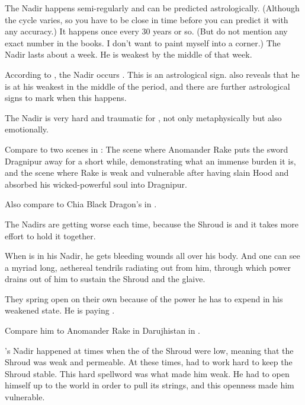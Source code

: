 The Nadir happens semi-regularly and can be predicted astrologically. 
(Although the cycle varies, so you have to be close in time before you can predict it with any accuracy.)
It happens once every 30 years or so. 
(But do not mention any exact number in the books. I don't want to paint myself into a corner.)
The Nadir lasts about a week. 
He is weakest by the middle of that week. 

According to \WanderersInDarknessEmph, the Nadir occurs . 
This is an astrological sign. 
\WanderersInDarknessEmph also reveals that he is at his weakest in the middle of the period, and there are further astrological signs to mark when this happens. 

The Nadir is very hard and traumatic for \Ishnaruchaefir, not only metaphysically but also emotionally. 

Compare to two scenes in \cite{StevenErikson:TolltheHounds}:
The scene where Anomander Rake puts the sword Dragnipur away for a short while, demonstrating what an immense burden it is, and the scene where Rake is weak and vulnerable after having slain Hood and absorbed his wicked-powerful soul into Dragnipur. 

Also compare to Chia Black Dragon's  in \cite{StephenMarley:SpiritMirror}. 

The Nadirs are getting worse each time, because the Shroud is  and it takes more effort to hold it together. 

When \Ishnaruchaefir is in his Nadir, he gets bleeding wounds all over his body. 
And one can see a myriad long, aethereal tendrils radiating out from him, through which power drains out of him to sustain the Shroud and the glaive. 

They spring open on their own because of the power he has to expend in his weakened state.
He is paying .
 
Compare him to Anomander Rake in Darujhistan in \cite{StevenErikson:TolltheHounds}. 

\Ishnaruchaefir's Nadir happened at times when the  of the Shroud were low, meaning that the Shroud was weak and permeable. 
At these times, \Ishnaruchaefir had to work hard to keep the Shroud stable. 
This hard spellword was what made him weak. 
He had to open himself up to the world in order to pull its strings, and this openness made him vulnerable. 

